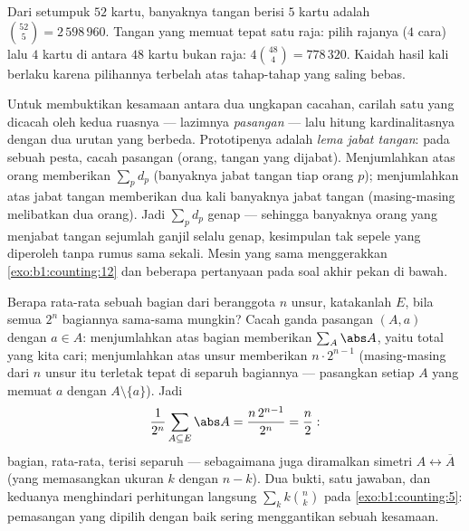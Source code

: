 \begin{example}\label{ex:b1:counting:poker}
Dari setumpuk $52$ kartu, banyaknya tangan berisi $5$ kartu adalah
$\binom{52}{5} = 2\,598\,960$. Tangan yang memuat tepat satu raja:
pilih rajanya ($4$ cara) lalu $4$ kartu di antara $48$ kartu bukan raja:
$4 \binom{48}{4} = 778\,320$. Kaidah hasil kali berlaku karena
pilihannya terbelah atas tahap-tahap yang saling bebas.
\end{example}

\begin{method}\label{met:b1:counting:doublecount}
Untuk membuktikan kesamaan antara dua ungkapan cacahan, carilah satu
 yang dicacah oleh kedua ruasnya --- lazimnya  \emph{pasangan}
--- lalu hitung kardinalitasnya dengan dua urutan yang berbeda.
Prototipenya adalah \emph{lema jabat tangan}: pada sebuah pesta, cacah pasangan
(orang, tangan yang dijabat). Menjumlahkan atas orang memberikan $\sum_p d_p$ (banyaknya
jabat tangan tiap orang $p$); menjumlahkan atas jabat tangan memberikan
dua kali banyaknya jabat tangan (masing-masing melibatkan dua orang). Jadi
$\sum_p d_p$ genap --- sehingga banyaknya orang yang menjabat tangan
sejumlah ganjil selalu genap, kesimpulan tak sepele yang diperoleh
tanpa rumus sama sekali. Mesin yang sama menggerakkan
\cref{exo:b1:counting:12} dan beberapa pertanyaan pada soal akhir
pekan di bawah.
\end{method}

\begin{example}\label{ex:b1:counting:averagesubset}
Berapa  rata-rata sebuah  bagian dari  beranggota $n$
unsur, katakanlah $E$, bila semua $2^n$  bagiannya sama-sama mungkin? Cacah ganda
pasangan $(A, a)$ dengan $a \in A$: menjumlahkan atas  bagian memberikan
$\sum_A \abs A$, yaitu total yang kita cari; menjumlahkan atas unsur memberikan
$n \cdot 2^{n-1}$ (masing-masing dari $n$ unsur itu terletak tepat di separuh
 bagiannya --- pasangkan setiap $A$ yang memuat $a$ dengan $A
\setminus \{a\}$). Jadi
\[
\frac{1}{2^n}\sum_{A \subseteq E} \abs A
= \frac{n\,2^{n-1}}{2^n} = \frac n2 :
\]
 bagian, rata-rata, terisi separuh --- sebagaimana juga diramalkan simetri $A
\leftrightarrow \overline A$ (yang memasangkan ukuran $k$ dengan $n - k$).
Dua bukti, satu jawaban, dan keduanya menghindari perhitungan langsung
$\sum_k k\binom nk$ pada \cref{exo:b1:counting:5}: pemasangan yang
dipilih dengan baik sering menggantikan sebuah kesamaan.
\end{example}

